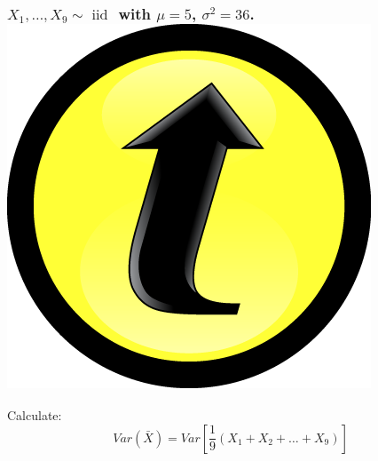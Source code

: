 \documentclass[handout]{beamer}
\begin{document}
\begin{frame}
\frametitle{$X_1,\hdots, X_{9} \sim \mbox{ iid }$ with $\mu=5$, $\sigma^2 = 36$. \hfill\includegraphics[scale = 0.05]{./images/clicker}}

\large Calculate:
	 $$Var(\bar{X}) = Var\left[\frac{1}{9}(X_1 + X_2 + \hdots + X_{9})\right]$$
\end{frame}
\end{document}
